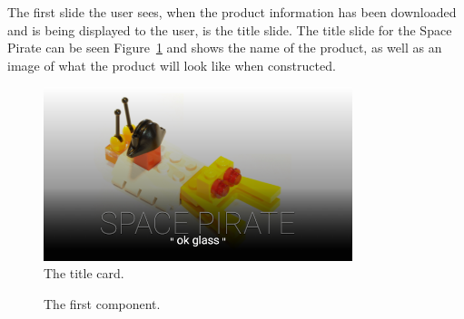 The first slide the user sees, when the product information has been downloaded and is being displayed to the user, is the title slide. The title slide for the Space Pirate can be seen Figure~\ref{demoCase1} and shows the name of the product, as well as an image of what the product will look like when constructed.

	\begin{figure}[ht!]
		\centering
		\includegraphics[width=90mm]{images/demoCase/1}
		\caption{The title card.}
		\label{demoCase1}
	\end{figure}
	

	
	\begin{figure}[ht!]
		\centering
		\qquad
		\caption{The first component.}
		\label{demoCaseSteering}
	\end{figure}

